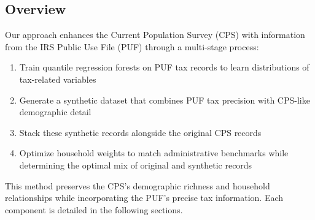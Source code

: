 \subsection{Overview}

Our approach enhances the Current Population Survey (CPS) with information from the IRS Public Use File (PUF) through a multi-stage process:

\begin{enumerate}
    \item Train quantile regression forests on PUF tax records to learn distributions of tax-related variables
    \item Generate a synthetic dataset that combines PUF tax precision with CPS-like demographic detail
    \item Stack these synthetic records alongside the original CPS records
    \item Optimize household weights to match administrative benchmarks while determining the optimal mix of original and synthetic records
\end{enumerate}

This method preserves the CPS's demographic richness and household relationships while incorporating the PUF's precise tax information. Each component is detailed in the following sections.